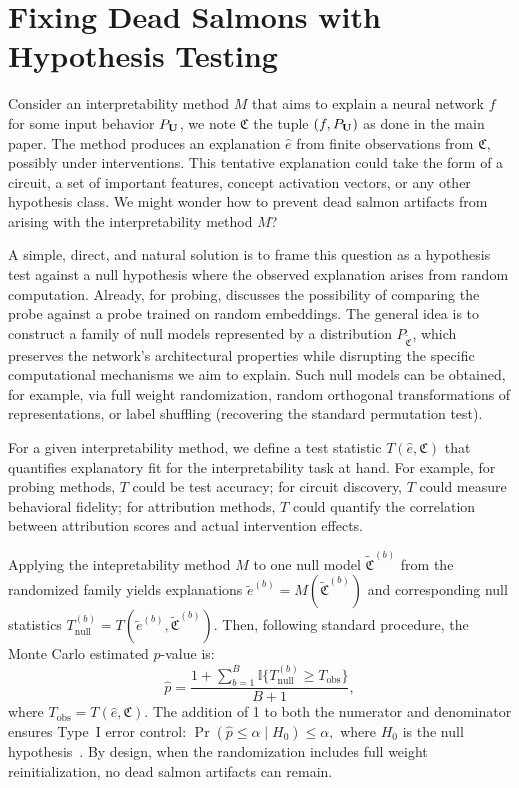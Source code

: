 \section{Fixing Dead Salmons with Hypothesis Testing}
\label{app:exp}

Consider an interpretability method $M$ that aims to explain a neural network $f$ for some input behavior $P_{\mathbf{U}}$, we note $\mathfrak{C}$ the tuple $(f, P_{\mathbf{U}})$ as done in the main paper. The method produces an explanation $\hat{e}$ from finite observations from $\mathfrak{C}$, possibly under interventions. This tentative explanation could take the form of a circuit, a set of important features, concept activation vectors, or any other hypothesis class. We might wonder how to prevent dead salmon artifacts from arising with the interpretability method $M$? 

A simple, direct, and natural solution is to frame this question as a hypothesis test against a null hypothesis where the observed explanation arises from random computation. Already, for probing, \citet{ravichander-etal-2021-probing} discusses the possibility of comparing the probe against a probe trained on random embeddings. The general idea is to construct a family of null models represented by a distribution $P_{\tilde{\mathfrak{C}}}$, which preserves the network’s architectural properties while disrupting the specific computational mechanisms we aim to explain. Such null models can be obtained, for example, via full weight randomization, random orthogonal transformations of representations, or label shuffling (recovering the standard permutation test).  

For a given interpretability method, we define a test statistic $T(\hat{e}, \mathfrak{C})$ that quantifies explanatory fit for the interpretability task at hand. For example, for probing methods, $T$ could be test accuracy; for circuit discovery, $T$ could measure behavioral fidelity; for attribution methods, $T$ could quantify the correlation between attribution scores and actual intervention effects.

Applying the intepretability method $M$ to one null model $\tilde{\mathfrak{C}}^{(b)}$ from the randomized family yields explanations $\tilde{e}^{(b)} = M(\tilde{\mathfrak{C}}^{(b)})$ and corresponding null statistics $T_{\text{null}}^{(b)} = T(\tilde{e}^{(b)}, \tilde{\mathfrak{C}}^{(b)})$. Then, following standard procedure, the Monte Carlo estimated $p$-value is:
\begin{equation}
\hat{p} = \frac{1 + \sum_{b=1}^B \mathbb{I}\{T_{\text{null}}^{(b)} \ge T_{\text{obs}}\}}{B + 1},
\end{equation}
where $T_{\text{obs}} = T(\hat{e}, \mathfrak{C})$. The addition of 1 to both the numerator and denominator ensures Type~I error control:
$
\Pr(\hat{p} \le \alpha \mid H_0) \le \alpha,
$ where $H_0$ is the null hypothesis~\citep{north2002note,phipson2010permutation}. By design, when the randomization includes full weight reinitialization, no dead salmon artifacts can remain.


